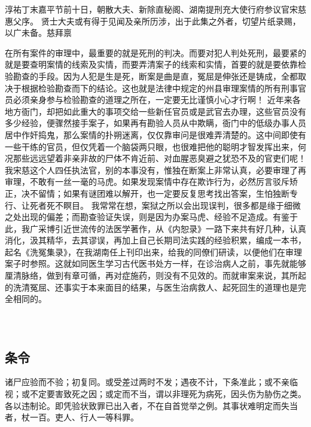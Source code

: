 \documentclass[12pt,UTF8]{ctexbook}
\begin{document}
淳祐丁末嘉平节前十日，朝散大夫、新除直秘阁、湖南提刑充大使行府参议官宋慈惠父序。
贤士大夫或有得于见闻及亲所历涉，出于此集之外者，切望片纸录赐，以广未备。慈拜禀


在所有案件的审理中，最重要的就是死刑的判决。而要对犯人判处死刑，最要紧的就是要查明案情的线索及实情，而要弄清案子的线索和实情，首要的就是要依靠检验勘查的手段。因为人犯是生是死，断案是曲是直，冤屈是伸张还是铸成，全都取决于根据检验勘查而下的结论。这也就是法律中规定的州县审理案情的所有刑事官员必须亲身参与检验勘查的道理之所在，一定要无比谨慎小心才行啊！
近年来各地方衙门，却把如此重大的事项交给一些新任官员或是武官去办理，这些官员没有多少经验，便骤然接手案子，如果再有勘验人员从中欺瞒，衙门中的低级办事人员居中作奸捣鬼，那么案情的扑朔迷离，仅仅靠审问是很难弄清楚的。这中间即使有一些干练的官员，但仅凭着一个脑袋两只眼，也很难把他的聪明才智发挥出来，何况那些远远望着非亲非故的尸体不肯近前、对血腥恶臭避之犹恐不及的官吏们呢！我宋慈这个人四任执法官，别的本事没有，惟独在断案上非常认真，必要审理了再审理，不敢有一丝一毫的马虎。如果发现案情中存在欺诈行为，必然厉言驳斥矫正，决不留情；如果有谜团难以解开，也一定要反复思考找出答案，生怕独断专行、让死者死不瞑目。
我常常在想，案狱之所以会出现误判，很多都是缘于细微之处出现的偏差；而勘查验证失误，则是因为办案马虎、经验不足造成。有鉴于此，我广采博引近世流传的法医学著作，从《内恕录》一路下来共有好几种，认真消化，汲其精华，去其谬误，再加上自己长期司法实践的经验积累，编成一本书，起名《洗冤集录》，在我湖南任上刊印出来，给我的同僚们研读，以便他们在审理案子时参照。这就如同医生学习古代医书处方一样，在诊治病人之前，事先就能够厘清脉络，做到有章可循，再对症施药，则没有不见效的。而就审案来说，其所起的洗清冤屈、还事实于本来面目的结果，与医生治病救人、起死回生的道理也是完全相同的。

\mainmatter

~\\

\part{}

\chapter{条令}

诸尸应验而不验；初复同。或受差过两时不发；遇夜不计，下条准此；或不亲临视；或不定要害致死之因；或定而不当，谓以非理死为病死，因头伤为胁伤之类。各以违制论。即凭验状致罪已出入者，不在自首觉举之例。其事状难明定而失当者，杖一百。吏人、行人一等科罪。
\end{document}
